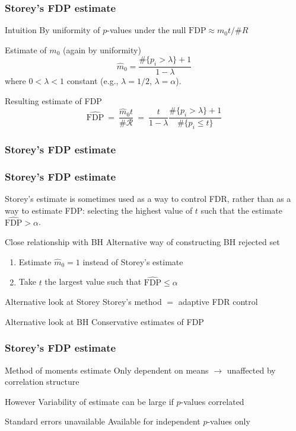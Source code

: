 \documentclass[xcolor={pdftex,dvipsnames,table}]{beamer}
\newcommand{\bb}[1]{\begin{block}{#1}}
\newcommand{\eb}{\end{block}}
\newcommand{\be}{\begin {enumerate}}
\newcommand{\ee}{\end{enumerate}}
\newcommand{\bfr}[1]{\begin{frame} \frametitle{#1}}
\begin{document}
\bfr{Storey's FDP estimate}

  \bb{Intuition}
    By uniformity of $p$-values under the null $\mathrm{FDP} \approx m_0t/\#R$
  \eb
  \bb{Estimate of $m_0$ (again by uniformity)}
  \[ \hat{m}_0 = \frac{ \#\{p_i > \lambda\}+1}{1-\lambda} \]
  where $0 < \lambda < 1$ constant (e.g., $\lambda = 1/2$, $\lambda = \alpha$).
  \eb
  \bb{Resulting estimate of FDP}
\[    \hat{\mathrm{FDP}}\ =\ \frac{\hat{m}_0t}{\#\mathcal{R}}\ =\ \frac{t}{1-\lambda}\frac{\#\{p_i > \lambda\}+1}{\#\{p_i \leq t\}} \]
  \eb
\end{frame}


\bfr{Storey's FDP estimate}
\end{frame}


\bfr{Storey's FDP estimate}

Storey's estimate is sometimes used as a way to control FDR, rather than as a way to estimate FDP: selecting the highest value of $t$ such that the estimate $\hat{\text{FDP}} > \alpha$.

  \bb{Close relationship with BH}
    Alternative way of constructing BH rejected set
    \be
      \item Estimate $\hat m_0 = 1$ instead of Storey's estimate
      \item Take $t$ the largest value such that $\hat{\mathrm{FDP}} \leq \alpha$
    \ee
  \eb
  \bb{Alternative look at Storey}
    Storey's method $=$ adaptive FDR control
  \eb
  \bb{Alternative look at BH}
    Conservative estimates of FDP
  \eb
\end{frame}


\bfr{Storey's FDP estimate}
  \bb{Method of moments estimate}
    Only dependent on means $\to$ unaffected by correlation structure
  \eb
  \bb{However}
    Variability of estimate can be large if $p$-values correlated
  \eb
  \bb{Standard errors unavailable}
    Available for independent $p$-values only
  \eb
\end{frame}
\end{document}
